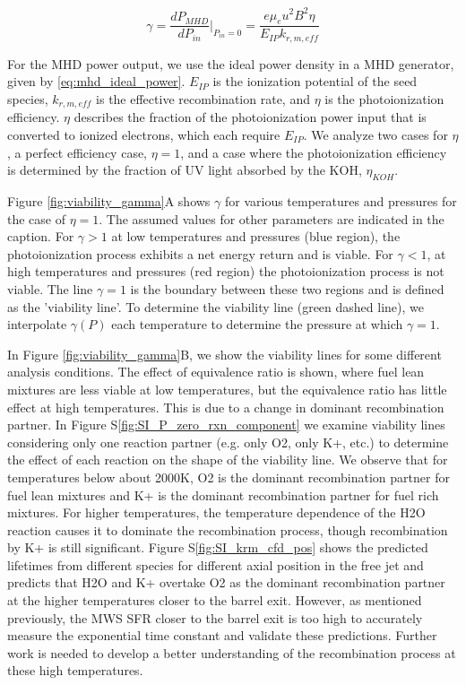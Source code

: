 \begin{equation}
\gamma = \frac{dP_{MHD}}{dP_{in}} \Big|_{P_{in}=0} = \frac{e \mu_e u^2 B^2 \eta}{E_{IP}k_{r, m, eff}} 
\end{equation}


For the MHD power output, we use the ideal power density in a MHD generator, given by \ref{eq:mhd_ideal_power}. $E_{IP}$ is the ionization potential of the seed species, $k_{r, m, eff}$ is the effective recombination rate, and $\eta$ is the photoionization efficiency. $\eta$ describes the fraction of the photoionization power input that is converted to ionized electrons, which each require $E_{IP}$. We analyze two cases for $\eta$, a perfect efficiency case, $\eta=1$, and a case where the photoionization efficiency is determined by the fraction of UV light absorbed by the KOH, $\eta_{KOH}$. 

Figure \ref{fig:viability_gamma}A shows $\gamma$ for various temperatures and pressures for the case of $\eta=1$. The assumed values for other parameters are indicated in the caption.  For $\gamma > 1$ at low temperatures and pressures (blue region), the photoionization process exhibits a net energy return and is viable. For $\gamma < 1$, at high temperatures and pressures (red region) the photoionization process is not viable. The line $\gamma = 1$ is the boundary between these two regions and is defined as the 'viability line'. To determine the viability line (green dashed line), we interpolate $\gamma (P)$ each temperature to determine the pressure at which $\gamma = 1$. 

In Figure \ref{fig:viability_gamma}B, we show the viability lines for some different analysis conditions. The effect of equivalence ratio is shown, where fuel lean mixtures are less viable at low temperatures, but the equivalence ratio has little effect at high temperatures. This is due to a change in dominant recombination partner. In Figure S\ref*{fig:SI_P_zero_rxn_component} we examine viability lines considering only one reaction partner (e.g. only O2, only K+, etc.) to determine the effect of each reaction on the shape of the viability line. We observe that for temperatures below about 2000K, O2 is the dominant recombination partner for fuel lean mixtures and K+ is the dominant recombination partner for fuel rich mixtures. For higher temperatures, the temperature dependence of the H2O reaction causes it to dominate the recombination process, though recombination by K+ is still significant. Figure S\ref*{fig:SI_krm_cfd_pos} shows the predicted lifetimes from different species for different axial position in the free jet and predicts that H2O and K+ overtake O2 as the dominant recombination partner at the higher temperatures closer to the barrel exit. However, as mentioned previously, the MWS SFR closer to the barrel exit is too high to accurately measure the exponential time constant and validate these predictions. Further work is needed to develop a better understanding of the recombination process at these high temperatures.  

